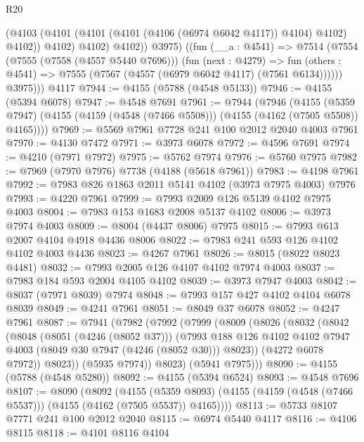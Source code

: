 \begin{lexlean}{R20}
\begin{coremodule}
                (@4103 (@4101 (@4101 (@4101 (@4106 (@6974 @6042 @4117)) @4104) @4102) @4102))
                @4102)
              @4102)
            @4102))
          @3975)
        ((fun (__a : @4541) =>
        @7514
          (@7554
            (@7555 (@7558 (@4557 @5440 @7696)))
            (fun (next : @4279) =>
            fun (others : @4541) => @7555 (@7567 (@4557 (@6979 @6042 @4117) (@7561 @6134))))))
          @3975)))
    @4117
@7944 := @4155 (@5788 (@4548 @5133))
@7946 := @4155 (@5394 @6078)
@7947 := @4548 @7691
@7961 := @7944
    (@7946
      (@4155
        (@5359 @7947)
        (@4155 (@4159 (@4548 (@7466 @5508))) (@4155 (@4162 (@7505 @5508)) @4165))))
@7969 := @5569 @7961 @7728 @241 @100 @2012 @2040 @4003 @7961
@7970 := @4130 @7472
@7971 := @3973 @6078
@7972 := @4596 @7691
@7974 := @4210 (@7971 @7972)
@7975 := @5762 @7974
@7976 := @5760 @7975
@7982 := @7969 (@7970 @7976) @7738 (@4188 (@5618 @7961))
@7983 := @4198 @7961
@7992 := @7983 @826 @1863 @2011 @5141 @4102 (@3973 @7975 @4003) @7976
@7993 := @4220 @7961
@7999 := @7993 @2009 @126 @5139 @4102 @7975 @4003
@8004 := @7983 @153 @1683 @2008 @5137 @4102
@8006 := @3973 @7974 @4003
@8009 := @8004 (@4437 @8006) @7975
@8015 := @7993 @613 @2007 @4104 @4918 @4436 @8006
@8022 := @7983 @241 @593 @126 @4102 @4102 @4003 @4436
@8023 := @4267 @7961
@8026 := @8015 (@8022 @8023 @4481)
@8032 := @7993 @2005 @126 @4107 @4102 @7974 @4003
@8037 := @7983 @184 @593 @2004 @4105 @4102
@8039 := @3973 @7947 @4003
@8042 := @8037 (@7971 @8039) @7974
@8048 := @7993 @157 @427 @4102 @4104 @6078 @8039
@8049 := @4241 @7961
@8051 := @8049 @37 @6078
@8052 := @4247 @7961
@8087 := @7941
    (@7982
      (@7992
        (@7999
          (@8009
            (@8026
              (@8032
                (@8042
                  (@8048
                    (@8051 (@4246 (@8052 @37)))
                    (@7993
                      @188
                      @126
                      @4102
                      @4102
                      @7947
                      @4003
                      (@8049 @30 @7947 (@4246 (@8052 @30)))
                      @8023))
                  (@4272 @6078 @7972))
                @8023))
            (@5935 @7974))
          @8023)
        (@5941 @7975)))
@8090 := @4155 (@5788 (@4548 @5280))
@8092 := @4155 (@5394 @6524)
@8093 := @4548 @7696
@8107 := @8090
    (@8092
      (@4155
        (@5359 @8093)
        (@4155 (@4159 (@4548 (@7466 @5537))) (@4155 (@4162 (@7505 @5537)) @4165))))
@8113 := @5733 @8107 @7771 @241 @100 @2012 @2040
@8115 := @6974 @5440 @4117
@8116 := @4106 @8115
@8118 := @4101 @8116 @4104

\end{coremodule}
\end{lexlean}
